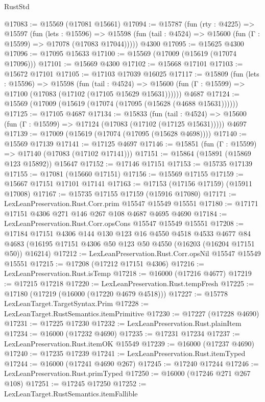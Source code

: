 \begin{lexlean}{RustStd}
\begin{coremodule}
{\begin{coremodule}
{{{{{{{{{{{{{{{{{{{{{{{{{{{{{{{{{{{{{{{{{{{{{{{{{{{{{{{{{{{{@17083 := @15569 (@17081 @15661)
@17094 := @15787
    (fun (rty : @4225) =>
    @15597
      (fun (lets : @15596) =>
      @15598 (fun (tail : @4524) => @15600 (fun (Γ : @15599) => @17078 (@17083 @17044)))))
    @4300
@17095 := @15625 @4300
@17096 := @17095 @15633
@17100 := @15569 (@17009 (@15619 (@17074 @17096)))
@17101 := @15669 @4300
@17102 := @15668 @17101
@17103 := @15672 @17101
@17105 := @17103 @17039 @16025
@17117 := @15809
    (fun (lets : @15596) =>
    @15598
      (fun (tail : @4524) =>
      @15600 (fun (Γ : @15599) => @17100 (@17083 (@17102 (@17105 @15629 @15631))))))
    @4687
@17124 := @15569 (@17009 (@15619 (@17074 (@17095 (@15628 (@4688 @15631))))))
@17125 := @17105 @4687
@17134 := @15833
    (fun (tail : @4524) => @15600 (fun (Γ : @15599) => @17124 (@17083 (@17102 (@17125 @15631)))))
    @4697
@17139 := @17009 (@15619 (@17074 (@17095 (@15628 @4698))))
@17140 := @15569 @17139
@17141 := @17125 @4697
@17146 := @15851 (fun (Γ : @15599) => @17140 (@17083 (@17102 @17141)))
@17151 := @15864 (@15891 (@15869 @123 @15892)) @15647
@17152 := @17146 @17151
@17153 := @15735 @17139
@17155 := @17081 (@15660 @17151)
@17156 := @15569 @17155
@17159 := @15667 @17151 @17101 @17141
@17163 := @17153 (@17156 @17159) (@15911 @17008)
@17167 := @15735 @17155 @17159 (@15916 @17080)
@17171 := LexLeanPreservation.Rust.Corr.prim @15547 @15549 @15551
@17180 := @17171 @17151 @4306 @271 @146 @267 @108 @4687 @4695 @4690
@17184 := LexLeanPreservation.Rust.Corr.opsCons @15547 @15549 @15551
@17208 := @17184
    @17151
    @4306
    @144
    @130
    @123
    @16
    @4550
    @4518
    @4533
    @4677
    @84
    @4683
    (@16195 @17151 @4306 @50 @123 @50 @4550 (@16203 (@16204 @17151 @50)) @16214)
@17212 := LexLeanPreservation.Rust.Corr.opsNil @15547 @15549 @15551
@17215 := @17208 (@17212 @17151 @4306)
@17216 := LexLeanPreservation.Rust.isTemp
@17218 := @16000 (@17216 @4677)
@17219 := @17215 @17218
@17220 := LexLeanPreservation.Rust.tempFresh
@17225 := @17180 (@17219 (@16000 (@17220 @4679 @4518)))
@17227 := @15778 LexLeanTarget.TargetSyntax.Prim
@17228 := LexLeanTarget.RustSemantics.itemPrimitive
@17230 := @17227 (@17228 @4690)
@17231 := @17225 @17230
@17232 := LexLeanPreservation.Rust.plainItem
@17234 := @16000 (@17232 @4690)
@17235 := @17231 @17234
@17237 := LexLeanPreservation.Rust.itemOK @15549
@17239 := @16000 (@17237 @4690)
@17240 := @17235 @17239
@17241 := LexLeanPreservation.Rust.itemTyped
@17244 := @16000 (@17241 @4690 @267)
@17245 := @17240 @17244
@17246 := LexLeanPreservation.Rust.primTyped
@17250 := @16000 (@17246 @271 @267 @108)
@17251 := @17245 @17250
@17252 := LexLeanTarget.RustSemantics.itemFallible
}}}}}}}}}}}}}}}}}}}}}}}}}}}}}}}}}}}}}}}}}}}}}}}}}}}}}}}}}}}}
\end{coremodule}}
\end{coremodule}
\end{lexlean}
